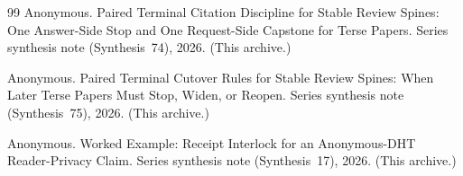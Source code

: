 \documentclass[11pt]{article}
\begin{document}
\begin{thebibliography}{99}
Anonymous.
\newblock Paired Terminal Citation Discipline for Stable Review Spines: One Answer-Side Stop and One Request-Side Capstone for Terse Papers.
\newblock Series synthesis note (Synthesis~74), 2026. (This archive.)

Anonymous.
\newblock Paired Terminal Cutover Rules for Stable Review Spines: When Later Terse Papers Must Stop, Widen, or Reopen.
\newblock Series synthesis note (Synthesis~75), 2026. (This archive.)

Anonymous.
\newblock Worked Example: Receipt Interlock for an Anonymous-DHT Reader-Privacy Claim.
\newblock Series synthesis note (Synthesis~17), 2026. (This archive.)

\end{thebibliography}
\end{document}
